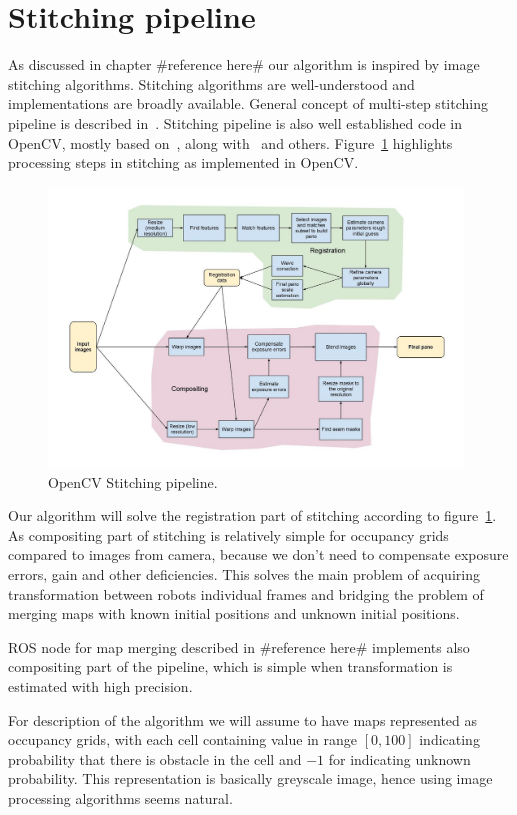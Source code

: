 \section{Stitching pipeline} %
\label{sec:stitchingpipeline}

As discussed in chapter \#reference here\# our algorithm is inspired by image stitching algorithms. Stitching algorithms are well-understood and implementations are broadly available. General concept of multi-step stitching pipeline is described in~\cite{Brown2006}. Stitching pipeline is also well established code in \gls{OpenCV}, mostly based on~\cite{Brown2006}, along with~\cite{Szeliski2004} \cite{Shum1998} and others. Figure~\ref{fig:opencv} highlights processing steps in stitching as implemented in \gls{OpenCV}.

\begin{figure}
	\centering
	\includegraphics[width=4.33in]{../img/StitchingPipeline.jpg}
	\caption{\gls{OpenCV} Stitching pipeline.}
	\label{fig:opencv}
\end{figure}

Our algorithm will solve the registration part of stitching according to figure~\ref{fig:opencv}. As compositing part of stitching is relatively simple for occupancy grids compared to images from camera, because we don't need to compensate exposure errors, gain and other deficiencies. This solves the main problem of acquiring transformation between robots individual frames and bridging the problem of merging maps with known initial positions and unknown initial positions.

\gls{ROS} node for map merging described in \#reference here\# implements also compositing part of the pipeline, which is simple when transformation is estimated with high precision.

For description of the algorithm we will assume to have maps represented as occupancy grids, with each cell containing value in range $[0,100]$ indicating probability that there is obstacle in the cell and $-1$ for indicating unknown probability. This representation is basically greyscale image, hence using image processing algorithms seems natural.

